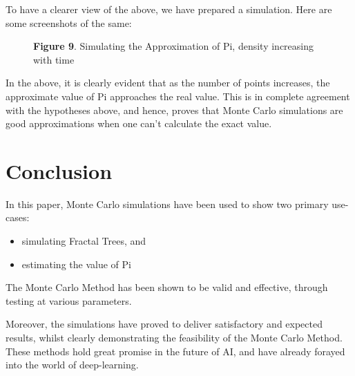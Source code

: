 \documentclass{resonance}
\begin{document}
To have a clearer view of the above, we have prepared a simulation. Here are some screenshots of the same:

\begin{figure}[h!]
	\hskip 0.7cm
    \vspace{20pt}
    \fbox{\texttt{[image: pi\_ss\_1]}}
    \fbox{\texttt{[image: pi\_ss\_2]}}
    \fbox{\texttt{[image: pi\_ss\_3]}}
    
    \vspace{-10pt}
    \hspace{30pt}\scriptsize{\textbf{Figure 9}. \normalfont Simulating the Approximation of Pi, density increasing with time}\\
\end{figure}
In the above, it is clearly evident that as the number of points increases, the approximate value of Pi approaches the real value. This is in complete agreement with the hypotheses above, and hence, proves that Monte Carlo simulations are good approximations when one can’t calculate the exact value.

\section{Conclusion}
In this paper, Monte Carlo simulations have been used to show two primary use-cases:
\begin{itemize}
\item simulating Fractal Trees, and
\item estimating the value of Pi
\end{itemize}

The Monte Carlo Method has been shown to be valid and effective, through testing at various parameters.

Moreover, the simulations have proved to deliver satisfactory and expected results, whilst clearly demonstrating the feasibility of the Monte Carlo Method. These methods hold great promise in the future of AI, and have already forayed into the world of deep-learning.\\\\\\\\\\\\\\\\
\end{document}
